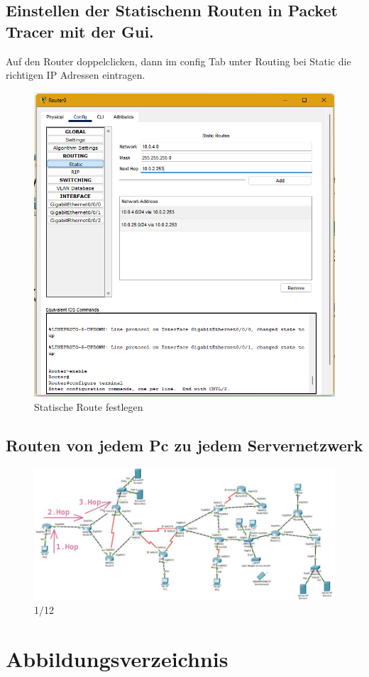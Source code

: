 \documentclass[a4paper]{article}
\begin{document}
\subsection{Einstellen der Statischenn Routen in Packet Tracer mit der Gui.}
Auf den Router doppelclicken, dann im config Tab unter Routing bei Static die richtigen IP Adressen eintragen.
\begin{figure}[h]
	\centering
	\includegraphics[scale=0.5]{ptgui.png}
	\caption{Statische Route festlegen}
\end{figure}
\subsection{Routen von jedem Pc zu jedem Servernetzwerk}
\begin{figure}[h]
	\centering
	\includegraphics[scale=0.6]{1.jpg}
	\caption{1/12}
\end{figure}

\newpage

\section{Abbildungsverzeichnis}

\listoffigures
\end{document}

